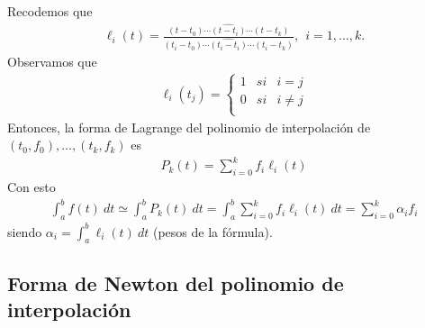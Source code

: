 Recodemos que
\begin{align*}
    \ell_i(t) = \frac{(t-t_0) \cdots \widehat{(t - t_i)} \cdots (t - t_k)}{(t_i - t_0) \cdots \widehat{(t_i - t_i)} \cdots (t_i - t_k)},\ \ i = 1,\ldots,k.
\end{align*}
Observamos que
\begin{align*}
    \ell_i(t_j) = \left\{ \begin{array}{lcc}
                              1 & si & i = j      \\
                              0 & si & i \not = j \\
                          \end{array}
    \right.
\end{align*}
Entonces, la forma de Lagrange del polinomio de interpolación de $(t_0,f_0),\ldots,(t_k,f_k)$ es
\begin{align*}
    P_k(t) = \sum_{i=0}^{k} f_i\ell_i(t)
\end{align*}
Con esto
\begin{align*}
    \int_{a}^{b} f(t) \ dt \simeq \int_{a}^{b} P_k(t) \ dt = \int_{a}^{b} \sum_{i=0}^{k} f_i\ell_i(t) \ dt = \sum_{i=0}^{k} \alpha_i f_i
\end{align*}
siendo $\alpha_i = \int_{a}^{b} \ell_i(t) \ dt$ (pesos de la fórmula).

\subsection{Forma de Newton del polinomio de interpolación}

